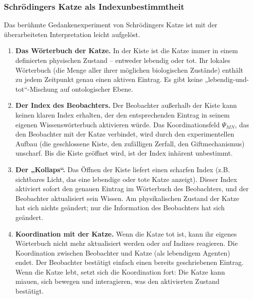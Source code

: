 \documentclass[12pt,a4paper]{article}
\theoremstyle{remark}
\begin{document}
	\medskip
	
	\subsubsection{Schrödingers Katze als Indexunbestimmtheit}
	
	Das berühmte Gedankenexperiment von Schrödingers Katze ist mit der überarbeiteten Interpretation leicht aufgelöst.
	
	\begin{enumerate}[leftmargin=*]
		\item \textbf{Das Wörterbuch der Katze.} In der Kiste ist die Katze immer in einem definierten physischen Zustand – entweder lebendig oder tot. Ihr lokales Wörterbuch (die Menge aller ihrer möglichen biologischen Zustände) enthält zu jedem Zeitpunkt genau einen aktiven Eintrag. Es gibt keine „lebendig-und-tot“-Mischung auf ontologischer Ebene.
		\item \textbf{Der Index des Beobachters.} Der Beobachter außerhalb der Kiste kann keinen klaren Index erhalten, der den entsprechenden Eintrag in seinem eigenen Wissenswörterbuch aktivieren würde. Das Koordinationsfeld $\Psi_{MN}$, das den Beobachter mit der Katze verbindet, wird durch den experimentellen Aufbau (die geschlossene Kiste, den zufälligen Zerfall, den Giftmechanismus) unscharf. Bis die Kiste geöffnet wird, ist der Index inhärent unbestimmt.
		\item \textbf{Der „Kollaps“.} Das Öffnen der Kiste liefert einen scharfen Index (z.B. sichtbares Licht, das eine lebendige oder tote Katze anzeigt). Dieser Index aktiviert sofort den genauen Eintrag im Wörterbuch des Beobachters, und der Beobachter aktualisiert sein Wissen. Am physikalischen Zustand der Katze hat sich nichts geändert; nur die Information des Beobachters hat sich geändert.
		\item \textbf{Koordination mit der Katze.} Wenn die Katze tot ist, kann ihr eigenes Wörterbuch nicht mehr aktualisiert werden oder auf Indizes reagieren. Die Koordination zwischen Beobachter und Katze (als lebendigem Agenten) endet. Der Beobachter bestätigt einfach einen bereits geschriebenen Eintrag. Wenn die Katze lebt, setzt sich die Koordination fort: Die Katze kann miauen, sich bewegen und interagieren, was den aktivierten Zustand bestätigt.
	\end{enumerate}
	
\end{document}
